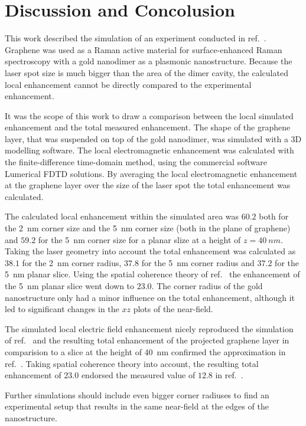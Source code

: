 \newpage
\section{Discussion and Concolusion}

This work described the simulation of an experiment conducted in ref.~\cite{heeg}. Graphene was used as a Raman active material for surface-enhanced Raman spectroscopy with a gold nanodimer as a plasmonic nanostructure. Because the laser spot size is much bigger than the area of the dimer cavity, the calculated local enhancement cannot be directly compared to the experimental enhancement.

It was the scope of this work to draw a comparison between the local simulated enhancement and the total measured enhancement. The shape of the graphene layer, that was suspended on top of the gold nanodimer, was simulated with a 3D modelling software. The local electromagnetic enhancement was calculated with the finite-difference time-domain method, using the commercial software Lumerical FDTD solutions. By averaging the local electromagnetic enhancement at the graphene layer over the size of the laser spot the total enhancement was calculated.

The calculated local enhancement within the simulated area was $60.2$  both for the \SI{2}{nm} corner size and the \SI{5}{nm} corner size (both in the plane of graphene) and $59.2$ for the \SI{5}{nm} corner size for a planar slize at a height of $z=\SI{40}{nm}$. Taking the laser geometry into account the total enhancement was calculated as $38.1$ for the \SI{2}{nm} corner radius, $37.8$ for the \SI{5}{nm} corner radius and $37.2$ for the \SI{5}{nm} planar slice. Using the spatial coherence theory of ref.~\cite{coherence} the enhancement of the \SI{5}{nm} planar slice went down to $23.0$. The corner radius of the gold nanostructure only had a minor influence on the total enhancement, although it led to significant changes in the $xz$ plots of the near-field.

The simulated local electric field enhancement nicely reproduced the simulation of ref.~\cite{heeg} and the resulting total enhancement of the projected graphene layer in comparision to a slice at the height of \SI{40}{nm} confirmed the approximation in ref.~\cite{heeg}. Taking spatial coherence theory into account, the resulting total enhancement of $23.0$ endorsed the measured value of $12.8$ in ref.~\cite{heeg}.

Further simulations should include even bigger corner radiuses to find an experimental setup that results in the same near-field at the edges of the nanostructure.
